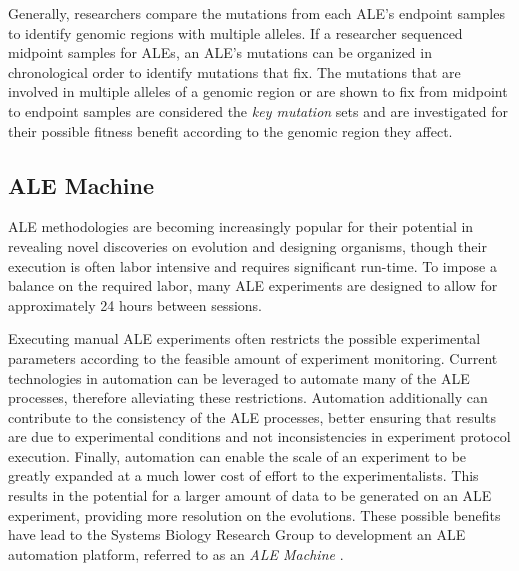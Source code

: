 \documentclass[12pt,final,masters,chapterheads]{ucsd}  %
\begin{document}
Generally, researchers compare the mutations from each ALE's endpoint samples to identify genomic regions with multiple alleles. If a researcher sequenced midpoint samples for ALEs, an ALE's mutations can be organized in chronological order to identify mutations that fix. The mutations that are involved in multiple alleles of a genomic region or are shown to fix from midpoint to endpoint samples are considered the \textit{key mutation} sets and are investigated for their possible fitness benefit according to the genomic region they affect.


\subsection{ALE Machine}

ALE methodologies are becoming increasingly popular for their potential in revealing novel discoveries on evolution and designing organisms, though their execution is often labor intensive and requires significant run-time. To impose a balance on the required labor, many ALE experiments are designed to allow for approximately 24 hours between sessions.

Executing manual ALE experiments often restricts the possible experimental parameters according to the feasible amount of experiment monitoring. Current technologies in automation can be leveraged to automate many of the ALE processes, therefore alleviating these restrictions. Automation additionally can contribute to the consistency of the ALE processes, better ensuring that results are due to experimental conditions and not inconsistencies in experiment protocol execution. Finally, automation can enable the scale of an experiment to be greatly expanded at a much lower cost of effort to the experimentalists. This results in the potential for a larger amount of data to be generated on an ALE experiment, providing more resolution on the evolutions. These possible benefits have lead to the Systems Biology Research Group to development an ALE automation platform, referred to as an \textit{ALE Machine} \cite{ryan_thesis}.
\end{document}
